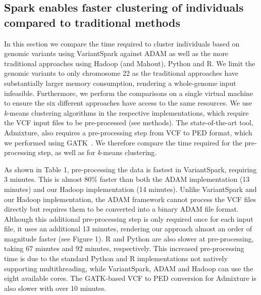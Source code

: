 \documentclass{bmcart}
\newcommand{\variantSpark}{{\sc VariantSpark}}
\newcommand{\kMeans}{\textit{k}-means}
\begin{document}
\subsection*{{\sc Spark} enables faster clustering of individuals compared to traditional methods}

In this section we compare the time required to cluster individuals based on genomic variants using \variantSpark{} against {\sc ADAM} as well as the more traditional approaches using Hadoop (and Mahout), Python and R. 
We limit the genomic variants to only chromosome 22 as the traditional approaches have substantially larger memory consumption, rendering a whole-genome input infeasible.
Furthermore, we perform the comparisons on a single virtual machine to ensure the six different approaches have access to the same resources.
We use \kMeans{} clustering algorithms in the respective implementations, which require the VCF input files to be pre-processed (see methods). 
The state-of-the-art tool, {\sc Admixture}, also requires a pre-processing step from VCF to PED format, which we performed using GATK~\cite{McKenna2010}.
We therefore compare the time required for the pre-processing step, as well as for \kMeans{} clustering.

As shown in Table 1, pre-processing the data is fastest in \variantSpark{}, requiring 3 minutes. %
This is almost 80\% faster than both the {\sc ADAM} implementation (13 minutes) %
and our Hadoop implementation (14 minutes). %
Unlike \variantSpark{} and our Hadoop implementation, the {\sc ADAM} framework cannot process the VCF files directly but requires them to be converted into a binary {\sc ADAM} file format. 
Although this additional pre-processing step is only required once for each input file, it uses an additional 13 minutes, %
rendering our approach almost an order of magnitude faster (see Figure 1).
R and Python are also slower at pre-processing, taking 67 minutes and 92 minutes, respectively. 
This increased pre-processing time is due to the standard Python and R implementations not natively supporting multithreading, while \variantSpark{}, {\sc ADAM} and Hadoop can use the eight available cores.
The GATK-based VCF to PED conversion for {\sc Admixture} is also slower with over 10 minutes. 
\end{document}

